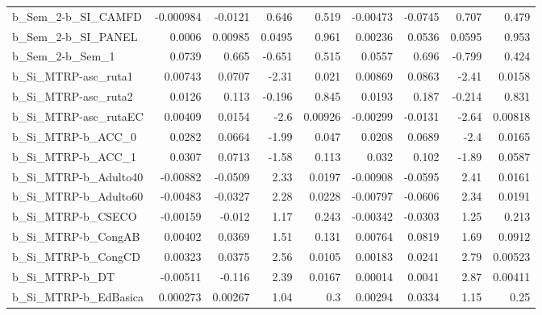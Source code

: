 \begin{tabular}{lrrrrrrrr}
b\_Sem\_2-b\_SI\_CAMFD         &   -0.000984 &      -0.0121 &    0.646 &    0.519 &   -0.00473 &     -0.0745 &        0.707 &         0.479 \\
b\_Sem\_2-b\_SI\_PANEL         &      0.0006 &      0.00985 &   0.0495 &    0.961 &    0.00236 &      0.0536 &       0.0595 &         0.953 \\
b\_Sem\_2-b\_Sem\_1            &      0.0739 &        0.665 &   -0.651 &    0.515 &     0.0557 &       0.696 &       -0.799 &         0.424 \\
b\_Si\_MTRP-asc\_ruta1        &     0.00743 &       0.0707 &    -2.31 &    0.021 &    0.00869 &      0.0863 &        -2.41 &        0.0158 \\
b\_Si\_MTRP-asc\_ruta2        &      0.0126 &        0.113 &   -0.196 &    0.845 &     0.0193 &       0.187 &       -0.214 &         0.831 \\
b\_Si\_MTRP-asc\_rutaEC       &     0.00409 &       0.0154 &     -2.6 &  0.00926 &   -0.00299 &     -0.0131 &        -2.64 &       0.00818 \\
b\_Si\_MTRP-b\_ACC\_0          &      0.0282 &       0.0664 &    -1.99 &    0.047 &     0.0208 &      0.0689 &         -2.4 &        0.0165 \\
b\_Si\_MTRP-b\_ACC\_1          &      0.0307 &       0.0713 &    -1.58 &    0.113 &      0.032 &       0.102 &        -1.89 &        0.0587 \\
b\_Si\_MTRP-b\_Adulto40       &    -0.00882 &      -0.0509 &     2.33 &   0.0197 &   -0.00908 &     -0.0595 &         2.41 &        0.0161 \\
b\_Si\_MTRP-b\_Adulto60       &    -0.00483 &      -0.0327 &     2.28 &   0.0228 &   -0.00797 &     -0.0606 &         2.34 &        0.0191 \\
b\_Si\_MTRP-b\_CSECO          &    -0.00159 &       -0.012 &     1.17 &    0.243 &   -0.00342 &     -0.0303 &         1.25 &         0.213 \\
b\_Si\_MTRP-b\_CongAB         &     0.00402 &       0.0369 &     1.51 &    0.131 &    0.00764 &      0.0819 &         1.69 &        0.0912 \\
b\_Si\_MTRP-b\_CongCD         &     0.00323 &       0.0375 &     2.56 &   0.0105 &    0.00183 &      0.0241 &         2.79 &       0.00523 \\
b\_Si\_MTRP-b\_DT             &    -0.00511 &       -0.116 &     2.39 &   0.0167 &    0.00014 &      0.0041 &         2.87 &       0.00411 \\
b\_Si\_MTRP-b\_EdBasica       &    0.000273 &      0.00267 &     1.04 &      0.3 &    0.00294 &      0.0334 &         1.15 &          0.25 \\

\end{tabular}

